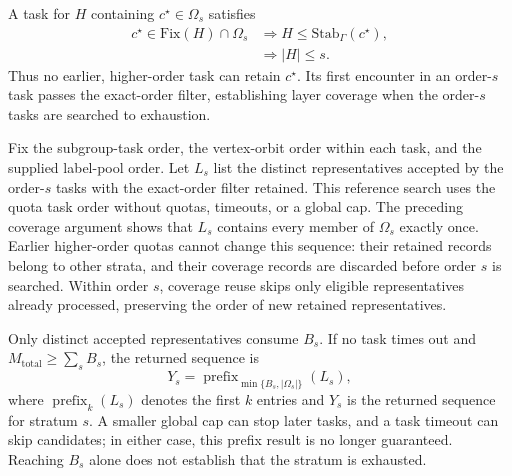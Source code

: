 \documentclass[a5paper, 10pt]{article}
\begin{document}
A task for $H$ containing $c^\star\in\Omega_s$ satisfies
\begin{equation}
\begin{aligned}
c^\star\in\mathrm{Fix}(H)\cap\Omega_s
&\Longrightarrow H\leq\mathrm{Stab}_{\Gamma}(c^\star),\\
&\Longrightarrow |H|\leq s.
\end{aligned}
\label{eq:quota_layer_order}
\end{equation}
Thus no earlier, higher-order task can retain $c^\star$. Its first encounter in an order-$s$ task passes the exact-order filter, establishing layer coverage when the order-$s$ tasks are searched to exhaustion.

Fix the subgroup-task order, the vertex-orbit order within each task, and the supplied label-pool order. Let $L_s$ list the distinct representatives accepted by the order-$s$ tasks with the exact-order filter retained. This reference search uses the quota task order without quotas, timeouts, or a global cap. The preceding coverage argument shows that $L_s$ contains every member of $\Omega_s$ exactly once. Earlier higher-order quotas cannot change this sequence: their retained records belong to other strata, and their coverage records are discarded before order $s$ is searched. Within order $s$, coverage reuse skips only eligible representatives already processed, preserving the order of new retained representatives.

Only distinct accepted representatives consume $B_s$. If no task times out and $M_{\mathrm{total}}\geq\sum_s B_s$, the returned sequence is
\begin{equation}
Y_s=\operatorname{prefix}_{\min\{B_s,|\Omega_s|\}}(L_s),
\label{eq:quota_prefix}
\end{equation}
where $\operatorname{prefix}_k(L_s)$ denotes the first $k$ entries and $Y_s$ is the returned sequence for stratum $s$. A smaller global cap can stop later tasks, and a task timeout can skip candidates; in either case, this prefix result is no longer guaranteed. Reaching $B_s$ alone does not establish that the stratum is exhausted.
\end{document}
